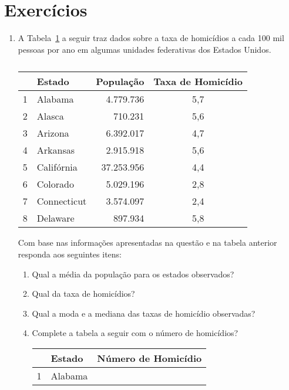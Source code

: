 \documentclass[oneside,a4paper,12pt]{article}
\begin{document}
\section{Exercícios}

\begin{enumerate}

\item A Tabela~\ref{tabela1} a seguir traz dados sobre a taxa de homicídios a cada 100 mil pessoas por ano em algumas unidades federativas dos Estados Unidos.

\begin{table}[htb]
\center
\begin{tabular}{p{1cm}lrc}
\hline 
 & \textbf{Estado} & \textbf{População} & \textbf{Taxa de Homicídio} \\ 
\hline 
1 & Alabama & 4.779.736 & 5,7 \\ 

2 & Alasca & 710.231 & 5,6 \\ 
 
3 & Arizona & 6.392.017 & 4,7 \\ 
 
4 & Arkansas & 2.915.918 & 5,6 \\ 

5 & Califórnia & 37.253.956 & 4,4 \\ 

6 & Colorado & 5.029.196 & 2,8 \\ 

7 & Connecticut & 3.574.097 & 2,4 \\ 

8 & Delaware & 897.934 & 5,8 \\ 
\hline
\end{tabular} 
\caption{} 
\label{tabela1}
\end{table}

Com base nas informações apresentadas na questão e na tabela anterior responda aos seguintes itens:
\begin{enumerate}
\item Qual a média da população para os estados observados?
\item Qual da taxa de homicídios?
\item Qual a moda e a mediana das taxas de homicídio observadas?
\item Complete a tabela a seguir com o número de homicídios?

\begin{table}[htb]
\center
\begin{tabular}{p{1cm}lc}
\hline 
 & \textbf{Estado} & \textbf{Número de Homicídio} \\ 
\hline 
1 & Alabama &  \\ 


\end{tabular}
\end{table}
\end{enumerate}
\end{enumerate}
\end{document}
